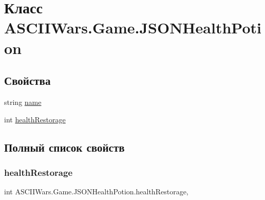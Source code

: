 \hypertarget{class_a_s_c_i_i_wars_1_1_game_1_1_j_s_o_n_health_potion}{}\section{Класс A\+S\+C\+I\+I\+Wars.\+Game.\+J\+S\+O\+N\+Health\+Potion}
\label{class_a_s_c_i_i_wars_1_1_game_1_1_j_s_o_n_health_potion}
\subsection*{Свойства}
\begin{DoxyCompactItemize}
\item 
string \hyperlink{class_a_s_c_i_i_wars_1_1_game_1_1_j_s_o_n_health_potion_a3f13e907e15e824e4a07fc7ea9260def}{name}
\item 
int \hyperlink{class_a_s_c_i_i_wars_1_1_game_1_1_j_s_o_n_health_potion_af1294529b5419e6e13cbec52087c8a17}{health\+Restorage}
\end{DoxyCompactItemize}


\subsection{Полный список свойств}
\hypertarget{class_a_s_c_i_i_wars_1_1_game_1_1_j_s_o_n_health_potion_af1294529b5419e6e13cbec52087c8a17}{}\label{class_a_s_c_i_i_wars_1_1_game_1_1_j_s_o_n_health_potion_af1294529b5419e6e13cbec52087c8a17} 
\subsubsection{\texorpdfstring{health\+Restorage}{healthRestorage}}
{\footnotesize\ttfamily int A\+S\+C\+I\+I\+Wars.\+Game.\+J\+S\+O\+N\+Health\+Potion.\+health\+Restorage\hspace{0.3cm}{\ttfamily [get]}, {\ttfamily [set]}}

\hypertarget{class_a_s_c_i_i_wars_1_1_game_1_1_j_s_o_n_health_potion_a3f13e907e15e824e4a07fc7ea9260def}{}\label{class_a_s_c_i_i_wars_1_1_game_1_1_j_s_o_n_health_potion_a3f13e907e15e824e4a07fc7ea9260def} 
